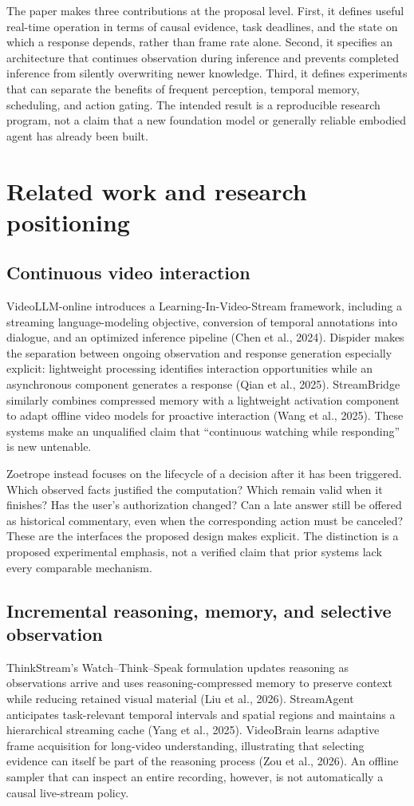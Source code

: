 \documentclass[11pt,letterpaper]{article}
\begin{document}
The paper makes three contributions at the proposal level. First, it defines useful real-time operation in terms of causal evidence, task deadlines, and the state on which a response depends, rather than frame rate alone. Second, it specifies an architecture that continues observation during inference and prevents completed inference from silently overwriting newer knowledge. Third, it defines experiments that can separate the benefits of frequent perception, temporal memory, scheduling, and action gating. The intended result is a reproducible research program, not a claim that a new foundation model or generally reliable embodied agent has already been built.

\section{Related work and research positioning}
\subsection{Continuous video interaction}
VideoLLM-online introduces a Learning-In-Video-Stream framework, including a streaming language-modeling objective, conversion of temporal annotations into dialogue, and an optimized inference pipeline (Chen et al., 2024). Dispider makes the separation between ongoing observation and response generation especially explicit: lightweight processing identifies interaction opportunities while an asynchronous component generates a response (Qian et al., 2025). StreamBridge similarly combines compressed memory with a lightweight activation component to adapt offline video models for proactive interaction (Wang et al., 2025). These systems make an unqualified claim that ``continuous watching while responding'' is new untenable.

Zoetrope instead focuses on the lifecycle of a decision after it has been triggered. Which observed facts justified the computation? Which remain valid when it finishes? Has the user's authorization changed? Can a late answer still be offered as historical commentary, even when the corresponding action must be canceled? These are the interfaces the proposed design makes explicit. The distinction is a proposed experimental emphasis, not a verified claim that prior systems lack every comparable mechanism.

\subsection{Incremental reasoning, memory, and selective observation}
ThinkStream's Watch--Think--Speak formulation updates reasoning as observations arrive and uses reasoning-compressed memory to preserve context while reducing retained visual material (Liu et al., 2026). StreamAgent anticipates task-relevant temporal intervals and spatial regions and maintains a hierarchical streaming cache (Yang et al., 2025). VideoBrain learns adaptive frame acquisition for long-video understanding, illustrating that selecting evidence can itself be part of the reasoning process (Zou et al., 2026). An offline sampler that can inspect an entire recording, however, is not automatically a causal live-stream policy.
\end{document}
